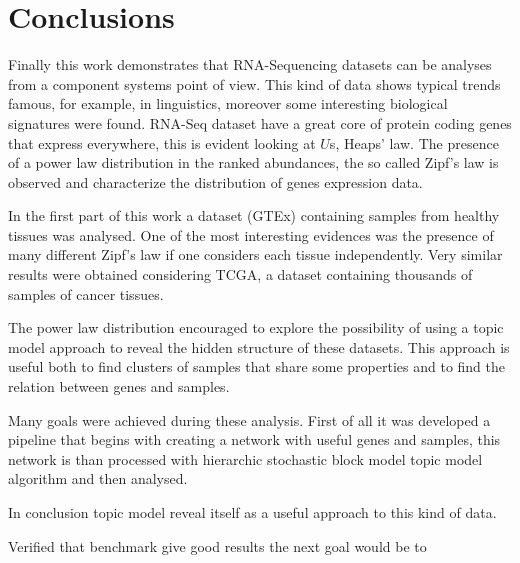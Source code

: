 \chapter{Conclusions}\label{ch:conclusions}
Finally this work demonstrates that RNA-Sequencing datasets can be analyses from a component systems point of view.
This kind of data shows typical trends famous, for example, in linguistics, moreover some interesting biological signatures were found. RNA-Seq dataset have a great core of protein coding genes that express everywhere, this is evident looking at $U$s, Heaps' law. The presence of a power law distribution in the ranked abundances, the so called Zipf's law is observed and characterize the distribution of genes expression data.

In the first part of this work a dataset (GTEx) containing samples from healthy tissues was analysed. One of the most interesting evidences was the presence of many different Zipf's law if one considers each tissue independently. Very similar results were obtained considering TCGA, a dataset containing thousands of samples of cancer tissues.

The power law distribution encouraged to explore the possibility of using a topic model approach to reveal the hidden structure of these datasets. This approach is useful both to find clusters of samples that share some properties and to find the relation between genes and samples.

Many goals were achieved during these analysis.
First of all it was developed a pipeline that begins with creating a network with useful genes and samples, this network is than processed with hierarchic stochastic block model topic model algorithm and then analysed.


In conclusion topic model reveal itself as a useful approach to this kind of data.

Verified that benchmark give good results the next goal would be to 

